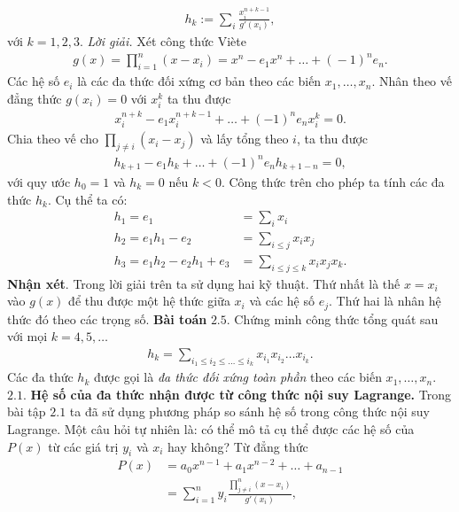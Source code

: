 \begin{multicols}{2}
	\begin{align*}
		h_{k}:=\sum_i\frac{x_i^{n+k-1}}{g'(x_i)},
	\end{align*}
	với $k=1,2,3.$
	\vskip 0.1cm 
	\textit{Lời giải.} 
	Xét công thức Viète 
	\begin{align*}
		g(x)\!=\!\prod_{i=1}^n(x\!-\!x_i)\!=\!x^{n}\!-\!e_1x^n\!+\!\ldots\!+\!(\!-\!1)^{n}e_{n}.
	\end{align*}
	Các hệ số $e_i$ là các { đa thức đối xứng cơ bản} theo
	các biến $x_1,\ldots,x_n$. 
	\vskip 0.1cm
	Nhân theo vế đẳng thức $g(x_i)=0$ với $x_i^{k}$ ta thu được
	\begin{align*}
		x_i^{n+k}-e_1x_i^{n+k-1}+\ldots+(-1)^{n}e_{n}
		x_i^{k}=0.
	\end{align*}	
	{ Chia theo vế cho  $ \prod_{j\neq i}(x_i-x_j)$}
	và lấy tổng theo $i$, ta thu được 
	\begin{align*}
		h_{k+1}-e_1h_{k}+\ldots+(-1)^{n}e_{n}h_{k+1-n}=0,
	\end{align*}
	với quy ước { $h_0=1$ và $h_k=0$ nếu $k<0$.} 
	Công thức trên cho phép ta tính các đa thức $h_k$. 
	Cụ thể ta có: 
	\begin{align*}
		h_1=e_1&=\sum_i x_i\\
		h_2=e_1h_1-e_2&=\sum_{i\leq j}x_ix_j\\
		h_3=e_1h_2-e_2h_1+e_3&=\sum_{i\leq j\leq k}x_ix_jx_k.
	\end{align*}
	\textbf{\color{hoccungpi}Nhận xét}. Trong lời giải trên ta sử dụng hai kỹ thuật. Thứ nhất là thế $x=x_i$ vào $g(x)$ để thu được một hệ thức giữa  $x_i$ và các hệ số $e_j$. Thứ hai là nhân hệ thức đó theo các {trọng số}. 
	\vskip 0.1cm
	\textbf{\color{hoccungpi}Bài toán} $\pmb{2.5.}$  Chứng minh công thức tổng quát sau với mọi $k=4,5, \ldots$
	\begin{align*}
		h_k=\sum_{i_1\leq i_2\leq\ldots\leq i_k}x_{i_1}x_{i_2}\ldots x_{i_k}.
	\end{align*}
	Các đa thức $h_k$ được gọi là { \em đa thức đối xứng toàn phần} theo các biến $x_1,\ldots,x_n$.
	\vskip 0.1cm
	$\pmb{2.1.}$ \textbf{\color{hoccungpi}Hệ số của đa thức nhận được từ công thức nội suy Lagrange.}
	Trong bài tập $2.1$ ta đã sử dụng phương pháp so sánh hệ số trong công thức nội suy Lagrange. Một câu hỏi tự nhiên là: { có thể mô tả cụ thể được các hệ số của $P(x)$ từ các giá trị $y_i$ và $x_i$ hay không?}
	\vskip 0.1cm
	Từ đẳng thức
	\begin{align*}
		P(x)&= a_0x^{n-1}+a_1x^{n-2}+\ldots+a_{n-1} \\
		&= \sum_{i=1}^n y_i \frac{\prod_{j\neq i}^n(x-x_i)}{g'(x_i)}, \tag{$6$}

\end{align*}
\end{multicols}
